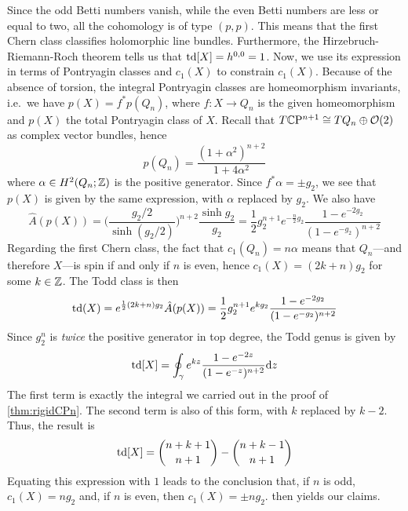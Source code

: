 \begin{myproof}
	Since the odd Betti numbers vanish, while the even Betti numbers are less or equal to two, all the cohomology is of type $(p,p)$. This means that the first Chern class classifies holomorphic line bundles. Furthermore, the Hirzebruch-Riemann-Roch theorem tells us that $\operatorname{td}[X]=h^{0,0}=1$. Now, we use its expression in terms of Pontryagin classes and $c_1(X)$ to constrain $c_1(X)$. Because of the absence of torsion, the integral Pontryagin classes are homeomorphism invariants, i.e.~we have $p(X)=f^*p(Q_n)$, where $f:X\to Q_n$ is the given homeomorphism and $p(X)$ the total Pontryagin class of $X$. Recall that $T\mathbb{C}\mathrm{P}^{n+1}\cong TQ_n\oplus \mathcal{O}(2)$ as complex vector bundles, hence
	\begin{equation*}
		p(Q_n)=\frac{(1+\alpha^2)^{n+2}}{1+4\alpha^2}
	\end{equation*}
	where $\alpha\in H^2(Q_n;\mathbb{Z})$ is the positive generator. Since $f^*\alpha=\pm g_2$, we see that $p(X)$ is given by the same expression, with $\alpha$ replaced by $g_2$. We also have
	\begin{equation*}
		\hat A(p(X))=\bigg(\frac{g_2/2}{\sinh(g_2/2)}\bigg)^{n+2}\frac{\sinh g_2}{g_2}
		=\frac{1}{2} g_2^{n+1} e^{-\frac{n}{2}g_2} \frac{1-e^{-2g_2}}{(1-e^{-g_2})^{n+2}}
	\end{equation*} 
	Regarding the first Chern class, the fact that $c_1(Q_n)=n\alpha$ means that $Q_n$---and therefore $X$---is spin if and only if $n$ is even, hence $c_1(X)=(2k+n)g_2$ for some $k\in\mathbb{Z}$. The Todd class is then
	\begin{equation*}
		\operatorname{td}(X)=e^{\frac{1}{2}(2k+n)g_2}\hat A(p(X))
		=\frac{1}{2}g_2 ^{n+1} e^{kg_2} \frac{1-e^{-2g_2}}{(1-e^{-g_2})^{n+2}}
	\end{equation*}
	Since $g_2^n$ is \emph{twice} the positive generator in top degree, the Todd genus is given by
	\begin{equation*}
		\operatorname{td}[X]=\oint_\gamma e^{k z} \frac{1-e^{-2 z}}{(1-e^{-z})^{n+2}}\mathrm{d} z
	\end{equation*}
	The first term is exactly the integral we carried out in the proof of \cref{thm:rigidCPn}. The second term is also of this form, with $k$ replaced by $k-2$. Thus, the result is
	\begin{equation*}
		\operatorname{td}[X]=\binom{n+k+1}{n+1}-\binom{n+k-1}{n+1}
	\end{equation*}
	Equating this expression with $1$ leads to the conclusion that, if $n$ is odd, $c_1(X)=ng_2$ and, if $n$ is even, then $c_1(X)=\pm ng_2$.  then yields our claims.
\end{myproof}

